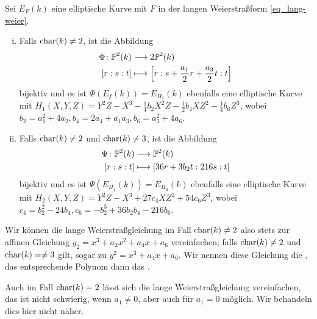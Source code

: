 \begin{satz}
\label{satz_11.8}
	Sei $E_F(k)$ eine elliptische Kurve mit $F$ in der langen Weierstraßform \eqref{eq_lang-weier}. 
	\begin{enumerate}[(i)]
		\item Falls $\Char(k) \neq 2$, ist die Abbildung
		\begin{equation}
		\begin{aligned}
			\Phi \colon \PP^2(k) &\longrightarrow 2\PP^2(k) \\
			[r:s:t] &\longmapsto \benbrace*{r : s + \frac{a_1}{2}r + \frac{a_3}{2}t : t}
		\end{aligned}
		\end{equation}
		bijektiv und es ist $\Phi(E_f(k)) = E_{H_1}(k)$ ebenfalls eine elliptische Kurve mit $H_1(X,Y,Z) = Y^2Z - X^3 - \frac{1}{4}b_2 X^2Z - \frac{1}{2} b_4 XZ^2 - \frac{1}{4} b_6 Z^3$, wobei $b_2 = a_1^2 + 4a_2, b_4 = 2a_4 + a_1 a_3, b_6 = a_3^2 + 4a_6$.
		\item Falls $\Char(k) \neq 2$ und $\Char(k) \neq 3$, ist die Abbildung
		\begin{equation}
		\begin{aligned}
			\Psi\colon \PP^2(k) &\longrightarrow \PP^2(k) \\
			[r:s:t] &\longmapsto [36r + 3b_2 t : 216s : t]
		\end{aligned}
		\end{equation}
		bijektiv und es ist $\Psi(E_{H_1}(k)) = E_{H_2}(k)$ ebenfalls eine elliptische Kurve mit $H_2(X,Y,Z) = Y^2Z - X^3 + 27c_4 XZ^2 + 54 c_6 Z^3$, wobei $c_4 = b_2^2 - 24b_4, c_6 = -b_2^3 + 36b_2b_4 - 216b_6$.
	\end{enumerate}
\end{satz}

\begin{bem}
	Wir können die lange Weierstraßgleichung im Fall $\Char(k) \neq 2$ also stets zur affinen Gleichung $y_2 = x^3 + a_2x^2 + a_4 x + a_6$ vereinfachen; falls $\Char(k) \neq 2$ und $\Char(k)= \neq 3$ gilt, sogar zu $y^2 = x^3 + a_4 x + a_6$. 
	Wir nennen diese Gleichung die , das entsprechende Polynom dann das .
\end{bem}

\begin{bem}
	Auch im Fall $\Char(k) = 2$ lässt sich die lange Weierstraßgleichung vereinfachen, das ist nicht schwierig, wenn $a_1 \neq 0$, aber auch für $a_1 = 0$ möglich. 
	Wir behandeln dies hier nicht näher.
\end{bem}

